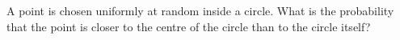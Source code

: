 A point is chosen uniformly at random inside a circle. What is the probability that the point is closer to the centre of the circle than to the circle itself?
